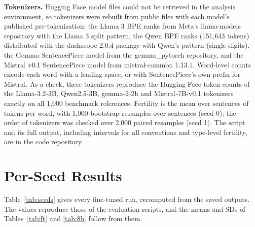\documentclass{article}
\begin{document}
\textbf{Tokenizers.} Hugging Face model files could not be retrieved in the analysis environment, so tokenizers were rebuilt from public files with each model's published pre-tokenization: the Llama 3 BPE ranks from Meta's llama-models repository with the Llama 3 split pattern, the Qwen BPE ranks (151,643 tokens) distributed with the dashscope 2.0.4 package with Qwen's pattern (single digits), the Gemma SentencePiece model from the gemma\_pytorch repository, and the Mistral v0.1 SentencePiece model from mistral-common 1.13.1. Word-level counts encode each word with a leading space, or with SentencePiece's own prefix for Mistral. As a check, these tokenizers reproduce the Hugging Face token counts of the Llama-3.2-3B, Qwen2.5-3B, gemma-2-2b and Mistral-7B-v0.1 tokenizers exactly on all 1,000 benchmark references. Fertility is the mean over sentences of tokens per word, with 1,000 bootstrap resamples over sentences (seed 0); the order of tokenizers was checked over 2,000 paired resamples (seed 1). The script and its full output, including intervals for all conventions and type-level fertility, are in the code repository.

\section{Per-Seed Results}\label{app:seeds}

Table~\ref{tab:seeds} gives every fine-tuned run, recomputed from the saved outputs. The values reproduce those of the evaluation scripts, and the means and SDs of Tables~\ref{tab:ft} and \ref{tab:8b} follow from them.
\end{document}
